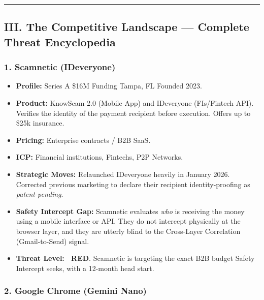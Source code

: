 \documentclass[
]{article}
\providecommand{\tightlist}{%
  \setlength{\itemsep}{0pt}\setlength{\parskip}{0pt}}
\begin{document}
\begin{center}\rule{0.5\linewidth}{0.5pt}\end{center}

\subsection{III. The Competitive Landscape --- Complete Threat
Encyclopedia}\label{iii.-the-competitive-landscape-complete-threat-encyclopedia}

\subsubsection{1. Scamnetic (IDeveryone)}\label{scamnetic-ideveryone}

\begin{itemize}
\tightlist
\item
  \textbf{Profile:} Series A \textbar{} \$16M Funding \textbar{} Tampa,
  FL \textbar{} Founded 2023.
\item
  \textbf{Product:} KnowScam 2.0 (Mobile App) and IDeveryone
  (FIs/Fintech API). Verifies the identity of the payment recipient
  before execution. Offers up to \$25k insurance.
\item
  \textbf{Pricing:} Enterprise contracts / B2B SaaS.
\item
  \textbf{ICP:} Financial institutions, Fintechs, P2P Networks.
\item
  \textbf{Strategic Moves:} Relaunched IDeveryone heavily in January
  2026. Corrected previous marketing to declare their recipient
  identity-proofing as \emph{patent-pending}.
\item
  \textbf{Safety Intercept Gap:} Scamnetic evaluates \emph{who} is
  receiving the money using a mobile interface or API. They do not
  intercept physically at the browser layer, and they are utterly blind
  to the Cross-Layer Correlation (Gmail-to-Send) signal.
\item
  \textbf{Threat Level:} 🔴 \textbf{RED}. Scamnetic is targeting the
  exact B2B budget Safety Intercept seeks, with a 12-month head start.
\end{itemize}

\subsubsection{2. Google Chrome (Gemini
Nano)}\label{google-chrome-gemini-nano}
\end{document}
